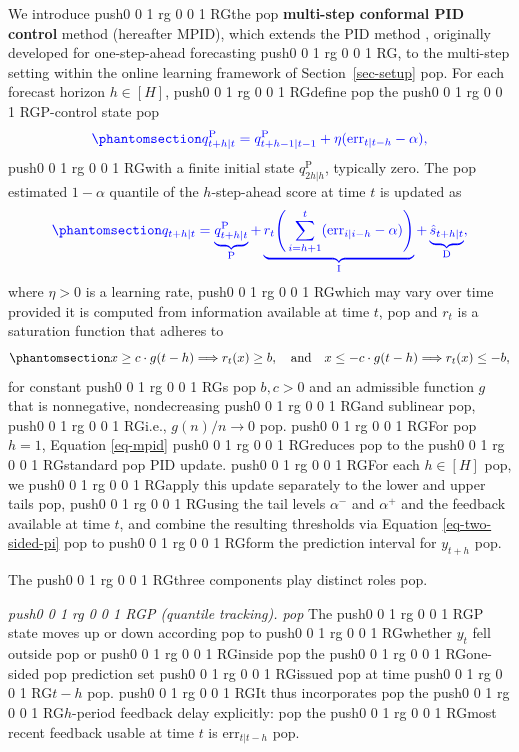 \documentclass[
  american,
  12pt]{article}
\theoremstyle{plain}
\theoremstyle{plain}
\theoremstyle{remark}
\newcommand{\CPTSadd}[1]{\ifmmode\else\leavevmode\fi\pdfcolorstack 0 push{0 0 1 rg 0 0 1 RG}#1\pdfcolorstack 0 pop}
\begin{document}
We introduce \CPTSadd{the} \textbf{multi-step conformal PID control} method
(hereafter MPID), which extends the PID method \citep{angelopoulos2024},
originally developed for one-step-ahead forecasting\CPTSadd{, to the multi-step
setting within the online learning framework of Section~\ref{sec-setup}}.
For each forecast horizon \(h\in[H]\), \CPTSadd{define} the \CPTSadd{P-control state}
\begin{equation}\CPTSadd{\phantomsection\label{eq-p-state}{
q^{\mathrm P}_{t+h|t}=q^{\mathrm P}_{t+h-1|t-1}+\eta(\mathrm{err}_{t|t-h}-\alpha),
}}\end{equation} \CPTSadd{with a finite initial state \(q^{\mathrm P}_{2h|h}\),
typically zero. The} estimated \(1-\alpha\) quantile of the
\(h\)-step-ahead score at time \(t\) is updated as
\begin{equation}\CPTSadd{\phantomsection\label{eq-mpid}{
q_{t+h|t}=\underbrace{q^{\mathrm P}_{t+h|t}}_{\mathrm P}+\underbrace{r_t\Bigg(\sum_{i=h+1}^t(\mathrm{err}_{i|i-h}-\alpha)\Bigg)}_{\mathrm I}+\underbrace{\hat{s}_{t+h|t}}_{\mathrm D},
}}\end{equation} where \(\eta > 0\) is a learning rate, \CPTSadd{which may vary
over time provided it is computed from information available at time
\(t\),} and \(r_t\) is a saturation function that adheres to
\begin{equation}\phantomsection\label{eq-saturation_h}{
x \geq c \cdot g(t-h) \Longrightarrow r_t(x) \geq b, \quad \text {and} \quad x \leq-c \cdot g(t-h) \Longrightarrow r_t(x) \leq -b,
}\end{equation} for constant\CPTSadd{s} \(b, c > 0\) and an admissible function
\(g\) that is nonnegative, nondecreasing \CPTSadd{and sublinear}, \CPTSadd{i.e.,
\(g(n)/n\to0\)}. \CPTSadd{For} \(h=1\), Equation \eqref{eq-mpid} \CPTSadd{reduces} to the
\CPTSadd{standard} PID update. \CPTSadd{For each \(h\in[H]\)}, we \CPTSadd{apply this update
separately to the lower and upper tails}, \CPTSadd{using the tail levels
\(\alpha^{-}\) and \(\alpha^{+}\) and the feedback available at time
\(t\), and combine the resulting thresholds via Equation
\eqref{eq-two-sided-pi}} to \CPTSadd{form the prediction interval for \(y_{t+h}\)}.

The \CPTSadd{three components play distinct roles}.

\emph{\CPTSadd{P (quantile tracking).}} The \CPTSadd{P state moves up or down according} to
\CPTSadd{whether \(y_t\) fell outside} or \CPTSadd{inside} the \CPTSadd{one-sided} prediction set
\CPTSadd{issued} at time \CPTSadd{\(t-h\)}. \CPTSadd{It thus incorporates} the \CPTSadd{\(h\)-period feedback
delay explicitly:} the \CPTSadd{most recent feedback usable at time \(t\) is
\(\mathrm{err}_{t|t-h}\)}.
\end{document}
